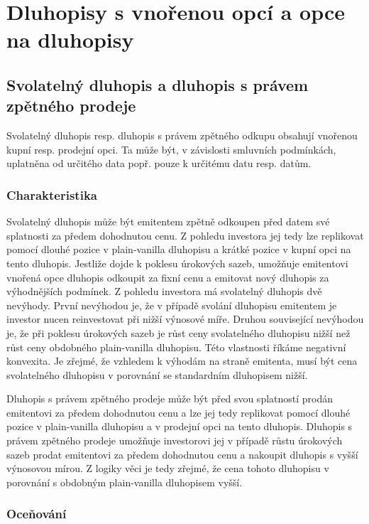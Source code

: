 \documentclass[a4paper]{book}
\begin{document}
\chapter{Dluhopisy s vnořenou opcí a opce na dluhopisy}

\section{Svolatelný dluhopis a dluhopis s právem zpětného prodeje}

Svolatelný dluhopis resp. dluhopis s právem zpětného odkupu obsahují vnořenou kupní resp. prodejní opci. Ta může být, v závislosti smluvních podmínkách, uplatněna od určitého data popř. pouze k určitému datu resp. datům.

\subsection{Charakteristika}

Svolatelný dluhopis může být emitentem zpětně odkoupen před datem své splatnosti za předem dohodnutou cenu. Z pohledu investora jej tedy lze replikovat pomocí dlouhé pozice v plain-vanilla dluhopisu a krátké pozice v kupní opci na tento dluhopis. Jestliže dojde k poklesu úrokových sazeb, umožňuje emitentovi vnořená opce dluhopis odkoupit za fixní cenu a emitovat nový dluhopis za výhodnějších podmínek. Z pohledu investora má svolatelný dluhopis dvě nevýhody. První nevýhodou je, že v případě svolání dluhopisu emitentem je investor nucen reinvestovat při nižší výnosové míře. Druhou související nevýhodou je, že při poklesu úrokových sazeb je růst ceny svolatelného dluhopisu nižší než růst ceny obdobného plain-vanilla dluhopisu. Této vlastnosti říkáme negativní konvexita. Je zřejmé, že vzhledem k výhodám na straně emitenta, musí být cena svolatelného dluhopisu v porovnání se standardním dluhopisem nižší. 

Dluhopis s právem zpětného prodeje může být před svou splatností prodán emitentovi za předem dohodnutou cenu a lze jej tedy replikovat pomocí dlouhé pozice v plain-vanilla dluhopisu a v prodejní opci na tento dluhopis. Dluhopis s právem zpětného prodeje umožňuje investorovi jej v případě růstu úrokových sazeb prodat emitentovi za předem dohodnutou cenu a nakoupit dluhopis s vyšší výnosovou mírou. Z logiky věci je tedy zřejmé, že cena tohoto dluhopisu v porovnání s obdobným plain-vanilla dluhopisem vyšší.

\subsection{Oceňování}
\end{document}
